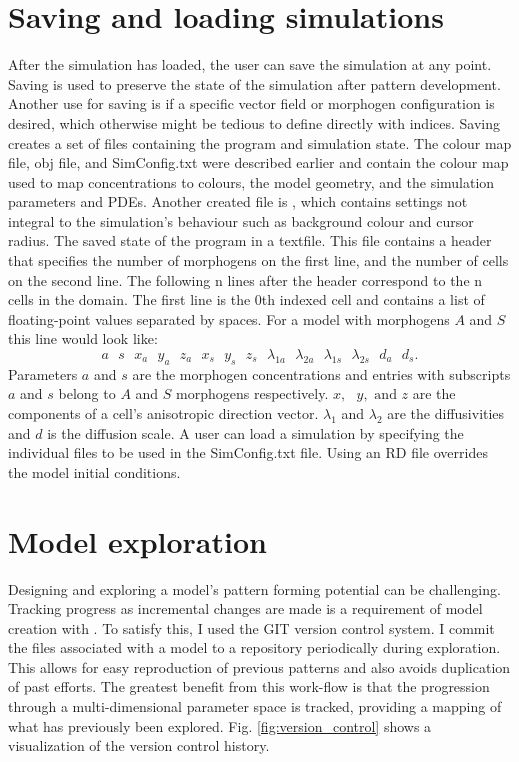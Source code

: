 \section{Saving and loading simulations}
After the simulation has loaded, the user can save the simulation at any point. Saving is used to preserve the state of the simulation after pattern development. Another use for saving is if a specific vector field or morphogen configuration is desired, which otherwise might be tedious to define directly with indices. Saving creates a set of files containing the program and simulation state. The colour map file, obj file, and SimConfig.txt were described earlier and contain the colour map used to map concentrations to colours, the model geometry, and the simulation parameters and PDEs. Another created file is , which contains settings not integral to the simulation's behaviour such as background colour and cursor radius. The saved state of the program in a  textfile. This file contains a header that specifies the number of morphogens on the first line, and the number of cells on the second line. The following n lines after the header correspond to the n cells in the domain. The first line is the 0th indexed cell and contains a list of floating-point values separated by spaces. For a model with morphogens $A$ and $S$ this line would look like:
\[a\text{ }s\text{ }x_a\text{ }y_a\text{ }z_a\text{ }x_s\text{ }y_s\text{ }z_s\text{ }\lambda_{1a}\text{ }\lambda_{2a}\text{ }\lambda_{1s}\text{ }\lambda_{2s}\text{ }d_a\text{ }d_s.\]
Parameters $a$ and $s$ are the morphogen concentrations and entries with subscripts $a$ and $s$ belong to $A$ and $S$ morphogens respectively. $x,\text{ }y, \text{ and } z$ are the components of a cell's anisotropic direction vector. $\lambda_1$ and $\lambda_2$ are the diffusivities and $d$ is the diffusion scale. A user can load a simulation by specifying the individual files to be used in the SimConfig.txt file. Using an RD file overrides the model initial conditions.

\section{Model exploration}
Designing and exploring a model's pattern forming potential can be challenging. Tracking progress as incremental changes are made is a requirement of model creation with \ProgramName{}. To satisfy this, I used the GIT version control system. I commit the files associated with a model to a repository periodically during exploration. This allows for easy reproduction of previous patterns and also avoids duplication of past efforts. The greatest benefit from this work-flow is that the progression through a multi-dimensional parameter space is tracked, providing a mapping of what has previously been explored. Fig. \ref{fig:version_control} shows a visualization of the version control history.

